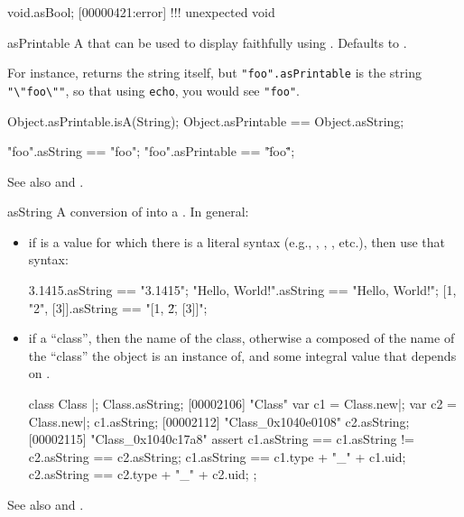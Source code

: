 \begin{urbiscriptapi}
\begin{urbiscript}
void.asBool;
[00000421:error] !!! unexpected void
\end{urbiscript}

\item[asPrintable]%
  A  that can be used to display faithfully \this using
  .  Defaults to .

  For instance,  returns the string itself, but
  \lstinline{"foo".asPrintable} is the string \lstinline{"\"foo\""}, so that
  using \lstinline{echo}, you would see \lstinline{"foo"}.
\begin{urbiassert}
Object.asPrintable.isA(String);
Object.asPrintable == Object.asString;

"foo".asString == "foo";
"foo".asPrintable == "\"foo\"";
\end{urbiassert}

  See also  and .

\item[asString]%
  A conversion of \this into a .  In general:
  \begin{itemize}
  \item if \this is a value for which there is a literal syntax (e.g.,
    , , , etc.), then use
    that syntax:
\begin{urbiassert}
         3.1415.asString == "3.1415";
"Hello, World!".asString == "Hello, World!";
  [1, "2", [3]].asString == "[1, \"2\", [3]]";
\end{urbiassert}

\item if \this a ``class'', then the name of the class, otherwise a
   composed of the name of the ``class'' the object is an
  instance of, and some integral value that depends on \this.
\begin{urbiscript}
class Class {}|;
Class.asString;
[00002106] "Class"
var c1 = Class.new|; var c2 = Class.new|;
c1.asString;
[00002112] "Class_0x1040e0108"
c2.asString;
[00002115] "Class_0x1040c17a8"
assert
{
  c1.asString == c1.asString != c2.asString == c2.asString;
  c1.asString == c1.type + "_" + c1.uid;
  c2.asString == c2.type + "_" + c2.uid;
};
\end{urbiscript}
\end{itemize}
  See also  and .


\end{urbiscriptapi}
